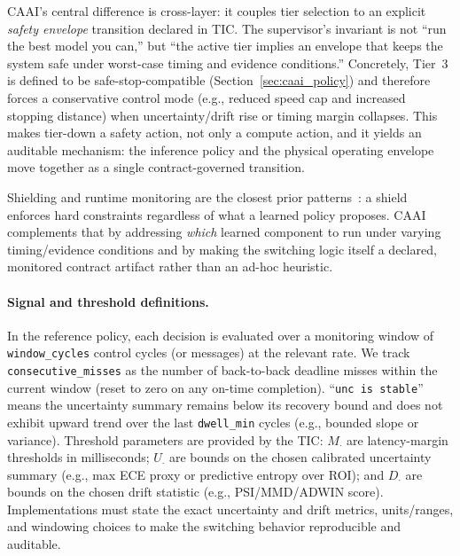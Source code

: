 \documentclass[smallextended]{svjour3}
\begin{document}
CAAI's central difference is cross-layer: it couples tier selection to an explicit \emph{safety envelope} transition declared in TIC. The supervisor's invariant is not ``run the best model you can,'' but ``the active tier implies an envelope that keeps the system safe under worst-case timing and evidence conditions.'' Concretely, Tier~3 is defined to be safe-stop-compatible (Section~\ref{sec:caai_policy}) and therefore forces a conservative control mode (e.g., reduced speed cap and increased stopping distance) when uncertainty/drift rise or timing margin collapses. This makes tier-down a safety action, not only a compute action, and it yields an auditable mechanism: the inference policy and the physical operating envelope move together as a single contract-governed transition.

Shielding and runtime monitoring are the closest prior patterns~\cite{alshiekh2018}: a shield enforces hard constraints regardless of what a learned policy proposes. CAAI complements that by addressing \emph{which} learned component to run under varying timing/evidence conditions and by making the switching logic itself a declared, monitored contract artifact rather than an ad-hoc heuristic.

\paragraph{Signal and threshold definitions.}
In the reference policy, each decision is evaluated over a monitoring window of \texttt{window\_cycles} control cycles (or messages) at the relevant rate. We track \texttt{consecutive\_misses} as the number of back-to-back deadline misses within the current window (reset to zero on any on-time completion). ``\texttt{unc is stable}'' means the uncertainty summary remains below its recovery bound and does not exhibit upward trend over the last \texttt{dwell\_min} cycles (e.g., bounded slope or variance). Threshold parameters are provided by the TIC: \(M_{\cdot}\) are latency-margin thresholds in milliseconds; \(U_{\cdot}\) are bounds on the chosen calibrated uncertainty summary (e.g., max ECE proxy or predictive entropy over ROI); and \(D_{\cdot}\) are bounds on the chosen drift statistic (e.g., PSI/MMD/ADWIN score). Implementations must state the exact uncertainty and drift metrics, units/ranges, and windowing choices to make the switching behavior reproducible and auditable.
\end{document}
